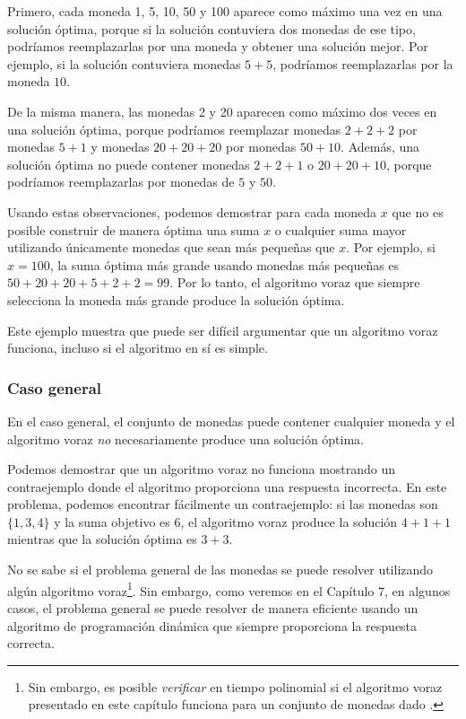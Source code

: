 Primero, cada moneda 1, 5, 10, 50 y 100 aparece
como máximo una vez en una solución óptima,
porque si la
solución contuviera dos monedas de ese tipo,
podríamos reemplazarlas por una moneda y
obtener una solución mejor.
Por ejemplo, si la solución contuviera
monedas $5+5$, podríamos reemplazarlas por la moneda $10$.

De la misma manera, las monedas 2 y 20 aparecen
como máximo dos veces en una solución óptima,
porque podríamos reemplazar
monedas $2+2+2$ por monedas $5+1$ y
monedas $20+20+20$ por monedas $50+10$.
Además, una solución óptima no puede contener
monedas $2+2+1$ o $20+20+10$,
porque podríamos reemplazarlas por monedas de $5$ y $50$.

Usando estas observaciones,
podemos demostrar para cada moneda $x$ que
no es posible construir de manera óptima
una suma $x$ o cualquier suma mayor utilizando únicamente monedas
que sean más pequeñas que $x$.
Por ejemplo, si $x=100$, la suma óptima más grande
usando monedas más pequeñas es $50+20+20+5+2+2=99$.
Por lo tanto, el algoritmo voraz que siempre selecciona
la moneda más grande produce la solución óptima.

Este ejemplo muestra que puede ser difícil
argumentar que un algoritmo voraz funciona,
incluso si el algoritmo en sí es simple.

\subsubsection{Caso general}

En el caso general, el conjunto de monedas puede contener cualquier moneda
y el algoritmo voraz \emph{no} necesariamente produce
una solución óptima.

Podemos demostrar que un algoritmo voraz no funciona
mostrando un contraejemplo
donde el algoritmo proporciona una respuesta incorrecta.
En este problema, podemos encontrar fácilmente un contraejemplo:
si las monedas son $\{1,3,4\}$ y la suma objetivo
es 6, el algoritmo voraz produce la solución
$4+1+1$ mientras que la solución óptima es $3+3$.

No se sabe si el problema general de las monedas
se puede resolver utilizando algún algoritmo voraz\footnote{Sin embargo, es posible
\emph{verificar} en tiempo polinomial
si el algoritmo voraz presentado en este capítulo funciona para
un conjunto de monedas dado \cite{pea05}.}.
Sin embargo, como veremos en el Capítulo 7,
en algunos casos,
el problema general se puede resolver de manera eficiente
usando un algoritmo de programación dinámica que siempre proporciona la
respuesta correcta.

